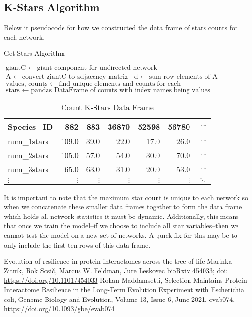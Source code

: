 \documentclass[12pt]{article}
\begin{document}
\subsection{K-Stars Algorithm}
Below it pseudocode for how we constructed the data frame of stars counts for each network.
\begin{algorithm}
\caption{Get Stars Algorithm}\label{alg:cap}
\begin{algorithmic}
\State $\text{giantC } \gets \text{ giant component for undirected network}$
\State $\text{A } \gets \text{ convert giantC to adjacency matrix}$
\State $\text{d } \gets \text{ sum row elements of A}$
\State $\text{values, counts } \gets \text{ find unique elements and counts for each}$
\State $\text{stars } \gets \text{ pandas DataFrame of counts with index names being values}$
\end{algorithmic}
\end{algorithm}
\begin{table}[H]
\centering
\caption{Count K-Stars Data Frame}
\begin{tabular}{lrrrrrr}
\toprule
Species\_ID &  882   &  883   &  36870 &  52598 &  56780 & $\cdots$\\
\midrule
num\_1stars &  109.0 &   39.0 &   22.0 &   17.0 &   26.0 & $\cdots$\\
num\_2stars &  105.0 &   57.0 &   54.0 &   30.0 &   70.0 & $\cdots$\\
num\_3stars &   65.0 &   63.0 &   31.0 &   20.0 &   53.0 & $\cdots$\\
$\vdots$ &   $\vdots$ &   $\vdots$ &   $\vdots$ &    $\vdots$ &   $\vdots$ & $\ddots$\\
\bottomrule
\end{tabular}
\end{table}
It is important to note that the maximum star count is unique to each network so when we concatenate these smaller data frames together to form the data frame which holds all network statistics it must be dynamic. Additionally, this means that once we train the model--if we choose to include all star variables--then we cannot test the model on a new set of networks. A quick fix for this may be to only include the first ten rows of this data frame. 
\begin{thebibliography}{1}
  Evolution of resilience in protein interactomes across the tree of life
Marinka Zitnik, Rok Sosič, Marcus W. Feldman, Jure Leskovec
bioRxiv 454033; doi: \url{https://doi.org/10.1101/454033}
 Rohan Maddamsetti, Selection Maintains Protein Interactome Resilience in the Long-Term Evolution Experiment with Escherichia coli, Genome Biology and Evolution, Volume 13, Issue 6, June 2021, evab074, \url{https://doi.org/10.1093/gbe/evab074}
  \end{thebibliography}

\end{document}
